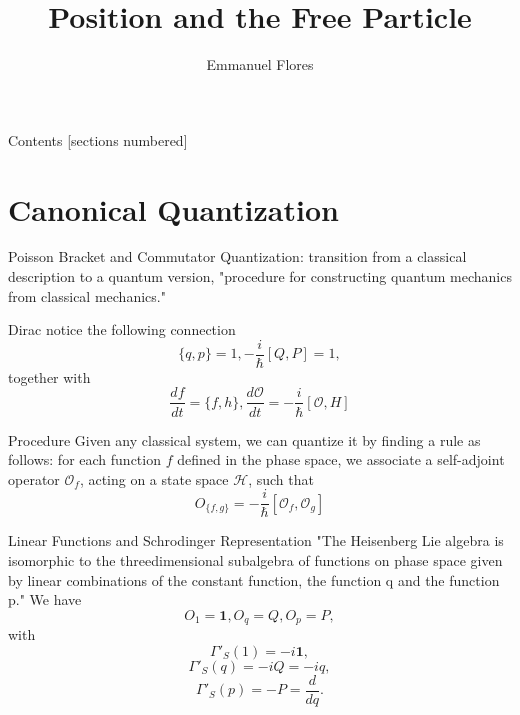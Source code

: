 \documentclass[12pt]{beamer}
\title{Position and the Free Particle}
\author{Emmanuel Flores}
\institute{Advanced Mathematical Methods, \\Tufts University}
\begin{document}
\maketitle
\begin{frame}{Contents}
	[sections numbered]
	\tableofcontents
\end{frame}
\section[Canonical Quantization]{Canonical Quantization}
\begin{frame}{Poisson Bracket and Commutator}
Quantization: transition from a classical description to a quantum version, "procedure for constructing quantum mechanics from classical mechanics."

Dirac notice the following connection
\begin{displaymath}
  \{q,p\}=1, -\frac{i}{\hbar}\left[Q,P\right] = 1,
\end{displaymath}
together with 
\begin{displaymath}
  \frac{df}{dt} = \{f, h\}, \frac{d\mathcal{O}}{dt}=-\frac{i}{\hbar}\left[\mathcal{O}, H\right]
\end{displaymath}
\end{frame}

\begin{frame}{Procedure}
Given any classical system, we can quantize it by finding a rule as follows: for each function $f$ defined in the phase space, we associate a self-adjoint operator $\mathcal{O}_{f}$, acting on a state space $\mathcal{H}$, such that 
\begin{displaymath}
  O_{\{f,g\}} = -\frac{i}{\hbar}\left[ \mathcal{O}_f, \mathcal{O}_g\right]
\end{displaymath}
\end{frame}

\begin{frame}{Linear Functions and Schrodinger Representation}
"The Heisenberg Lie algebra is isomorphic to the threedimensional subalgebra of functions on phase space given by linear combinations of the constant function, the function q and the function p."
We have
\begin{displaymath}
  O_1 = \mathbf{1}, O_q = Q, O_p = P,
\end{displaymath}
with
\begin{displaymath}
  \Gamma'_{S}(1)=-i\mathbf{1},
\end{displaymath}
\begin{displaymath}
  \Gamma'_{S}(q) = -iQ = -iq,
\end{displaymath}
\begin{displaymath}
    \Gamma'_{S}(p) = -P=\frac{d}{dq}.
\end{displaymath}
\end{frame}
\end{document}
